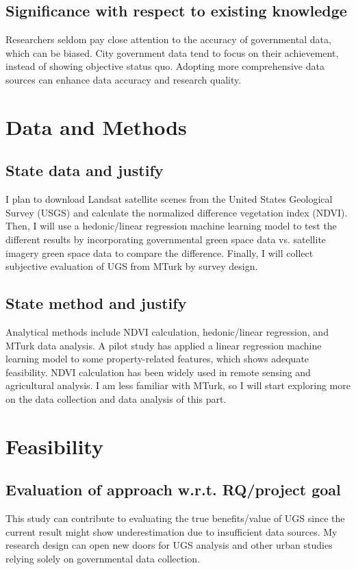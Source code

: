 \documentclass{article}
\begin{document}
\subsection*{Significance with respect to existing knowledge}
Researchers seldom pay close attention to the accuracy of governmental data, which can be biased. City government data tend to focus on their achievement, instead of showing objective status quo. Adopting more comprehensive data sources can enhance data accuracy and research quality.

\section{Data and Methods}
\subsection*{State data and justify}
I plan to download Landsat satellite scenes from the United States Geological Survey (USGS) and calculate the normalized difference vegetation index (NDVI). Then, I will use a hedonic/linear regression machine learning model to test the different results by incorporating governmental green space data vs. satellite imagery green space data to compare the difference. Finally, I will collect subjective evaluation of UGS from MTurk by survey design.


\subsection*{State method and justify}
Analytical methods include NDVI calculation, hedonic/linear regression, and MTurk data analysis. A pilot study has applied a linear regression machine learning model to some property-related features, which shows adequate feasibility. NDVI calculation has been widely used in remote sensing and agricultural analysis. I am less familiar with MTurk, so I will start exploring more on the data collection and data analysis of this part.


\section{Feasibility}
\subsection*{Evaluation of approach w.r.t. RQ/project goal}
This study can contribute to evaluating the true benefits/value of UGS since the current result might show underestimation due to insufficient data sources. My research design can open new doors for UGS analysis and other urban studies relying solely on governmental data collection.
\end{document}
